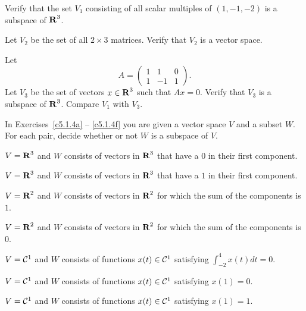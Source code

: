 \documentclass{ximera}
\begin{document}
\EXER

\TEXER

\begin{exercise} \label{c5.1.1}
Verify that the set $V_1$ consisting of all scalar multiples of
$(1,-1,-2)$ is a subspace of $\mbox{$\bf{R}$}^3$.
\end{exercise}

\begin{exercise} \label{c5.1.2}
Let $V_2$ be the set of all $2\times 3$ matrices.   Verify that
$V_2$ is a vector space.
\end{exercise}

\begin{exercise} \label{c5.1.3}
Let
\[
A=\left(\begin{array}{rrr} 1 & 1 & 0\\ 1 & -1 & 1 \end{array}
\right).
\]
Let $V_3$ be the set of vectors $x\in\mbox{$\bf{R}$}^3$ such that $Ax=0$.
Verify that $V_3$ is a subspace of $\mbox{$\bf{R}$}^3$.  Compare $V_1$ with
$V_3$.
\end{exercise}

\noindent In Exercises~\ref{c5.1.4a} -- \ref{c5.1.4f} you are given a
vector space $V$ and a subset $W$.  For each pair, decide whether or
not $W$ is a subspace of $V$.
\begin{exercise} \label{c5.1.4a}
$V=\mbox{$\bf{R}$}^3$ and $W$ consists of vectors in $\mbox{$\bf{R}$}^3$
     that have a $0$ in their first component.
\end{exercise}
\begin{exercise} \label{c5.1.4b}
$V=\mbox{$\bf{R}$}^3$ and $W$ consists of vectors in $\mbox{$\bf{R}$}^3$
     that have a $1$ in their first component.
\end{exercise}
\begin{exercise} \label{c5.1.4d}
$V=\mbox{$\bf{R}$}^2$ and $W$ consists of vectors in $\mbox{$\bf{R}$}^2$
     for which the sum of the components is $1$.
\end{exercise}
\begin{exercise} \label{c5.1.4c}
$V=\mbox{$\bf{R}$}^2$ and $W$ consists of vectors in $\mbox{$\bf{R}$}^2$
     for which the sum of the components is $0$.
\end{exercise}
\begin{exercise} \label{c5.1.4g}
$V={\cal C}^1$ and $W$ consists of functions
     $x(t)\in{\cal C}^1$ satisfying $\int_{-2}^4x(t)dt =0$.
\end{exercise}
\begin{exercise} \label{c5.1.4e}
$V={\cal C}^1$ and $W$ consists of functions
     $x(t)\in{\cal C}^1$ satisfying $x(1)=0$.
\end{exercise}
\begin{exercise} \label{c5.1.4f}
$V={\cal C}^1$ and $W$ consists of functions
     $x(t)\in{\cal C}^1$ satisfying $x(1)=1$.
\end{exercise}
\end{document}
